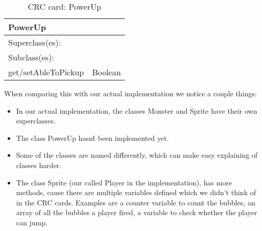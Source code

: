 \begin{table}[h!]
\centering
\label{crc_powerup}
\begin{tabular}{|l|l|}
\hline
\multicolumn{2}{|l|}{\textbf{PowerUp}} \\ \hline
\multicolumn{2}{|l|}{Superclass(es):} \\ \hline
\multicolumn{2}{|l|}{Subclass(es):} \\ \hline
get/setAbleToPickup           & Boolean \\ \hline
\end{tabular}
\caption{CRC card: PowerUp}
\end{table}

\newpage
When comparing this with our actual implementation we notice a couple things:
\begin{itemize}
\item In our actual implementation, the classes Monster and Sprite have their own superclasses.
\item The class PowerUp hasn\'t been implemented yet. 
\item Some of the classes are named differently, which can make easy explaining of classes harder. 
\item The class Sprite (our called Player in the implementation), has more methods, cause there are multiple variables defined which we didn't think of in the CRC cards. Examples are a counter variable to count the bubbles, an array of all the bubbles a player fired, a variable to check whether the player can jump. 
\end{itemize}